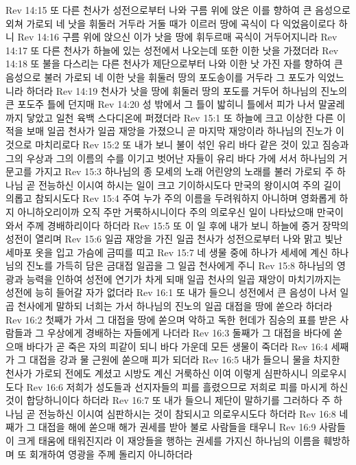 Rev 14:15  또 다른 천사가 성전으로부터 나와 구름 위에 앉은 이를 향하여 큰 음성으로 외쳐 가로되 네 낫을 휘둘러 거두라 거둘 때가 이르러 땅에 곡식이 다 익었음이로다 하니
Rev 14:16  구름 위에 앉으신 이가 낫을 땅에 휘두르매 곡식이 거두어지니라
Rev 14:17  또 다른 천사가 하늘에 있는 성전에서 나오는데 또한 이한 낫을 가졌더라
Rev 14:18  또 불을 다스리는 다른 천사가 제단으로부터 나와 이한 낫 가진 자를 향하여 큰 음성으로 불러 가로되 네 이한 낫을 휘둘러 땅의 포도송이를 거두라 그 포도가 익었느니라 하더라
Rev 14:19  천사가 낫을 땅에 휘둘러 땅의 포도를 거두어 하나님의 진노의 큰 포도주 틀에 던지매
Rev 14:20  성 밖에서 그 틀이 밟히니 틀에서 피가 나서 말굴레까지 닿았고 일천 육백 스다디온에 퍼졌더라
Rev 15:1  또 하늘에 크고 이상한 다른 이적을 보매 일곱 천사가 일곱 재앙을 가졌으니 곧 마지막 재앙이라 하나님의 진노가 이것으로 마치리로다
Rev 15:2  또 내가 보니 불이 섞인 유리 바다 같은 것이 있고 짐승과 그의 우상과 그의 이름의 수를 이기고 벗어난 자들이 유리 바다 가에 서서 하나님의 거문고를 가지고
Rev 15:3  하나님의 종 모세의 노래 어린양의 노래를 불러 가로되 주 하나님 곧 전능하신 이시여 하시는 일이 크고 기이하시도다 만국의 왕이시여 주의 길이 의롭고 참되시도다
Rev 15:4  주여 누가 주의 이름을 두려워하지 아니하며 영화롭게 하지 아니하오리이까 오직 주만 거룩하시니이다 주의 의로우신 일이 나타났으매 만국이 와서 주께 경배하리이다 하더라
Rev 15:5  또 이 일 후에 내가 보니 하늘에 증거 장막의 성전이 열리며
Rev 15:6  일곱 재앙을 가진 일곱 천사가 성전으로부터 나와 맑고 빛난 세마포 옷을 입고 가슴에 금띠를 띠고
Rev 15:7  네 생물 중에 하나가 세세에 계신 하나님의 진노를 가득히 담은 금대접 일곱을 그 일곱 천사에게 주니
Rev 15:8  하나님의 영광과 능력을 인하여 성전에 연기가 차게 되매 일곱 천사의 일곱 재앙이 마치기까지는 성전에 능히 들어갈 자가 없더라
Rev 16:1  또 내가 들으니 성전에서 큰 음성이 나서 일곱 천사에게 말하되 너희는 가서 하나님의 진노의 일곱 대접을 땅에 쏟으라 하더라
Rev 16:2  첫째가 가서 그 대접을 땅에 쏟으며 악하고 독한 헌데가 짐승의 표를 받은 사람들과 그 우상에게 경배하는 자들에게 나더라
Rev 16:3  둘째가 그 대접을 바다에 쏟으매 바다가 곧 죽은 자의 피같이 되니 바다 가운데 모든 생물이 죽더라
Rev 16:4  세째가 그 대접을 강과 물 근원에 쏟으매 피가 되더라
Rev 16:5  내가 들으니 물을 차지한 천사가 가로되 전에도 계셨고 시방도 계신 거룩하신 이여 이렇게 심판하시니 의로우시도다
Rev 16:6  저희가 성도들과 선지자들의 피를 흘렸으므로 저희로 피를 마시게 하신 것이 합당하니이다 하더라
Rev 16:7  또 내가 들으니 제단이 말하기를 그러하다 주 하나님 곧 전능하신 이시여 심판하시는 것이 참되시고 의로우시도다 하더라
Rev 16:8  네째가 그 대접을 해에 쏟으매 해가 권세를 받아 불로 사람들을 태우니
Rev 16:9  사람들이 크게 태움에 태워진지라 이 재앙들을 행하는 권세를 가지신 하나님의 이름을 훼방하며 또 회개하여 영광을 주께 돌리지 아니하더라
